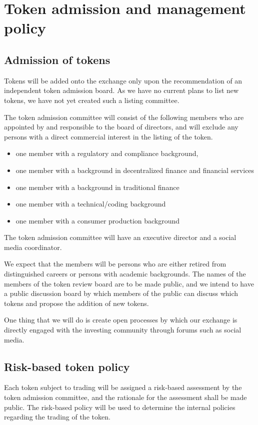 \chapter{Token admission and management policy}

\section{Admission of tokens}

Tokens will be added onto the exchange only upon the recommendation of
an independent token admission board.  As we have no current plans to
list new tokens, we have not yet created such a listing committee.

The token admission committee will consist of the following members
who are appointed by and responsible to the board of directors, and
will exclude any persons with a direct commercial interest in the
listing of the token.

\begin{itemize}
  \item one member with a regulatory and compliance background,
  \item one member with a background in decentralized finance and
    financial services
  \item one member with a background in traditional finance
  \item one member with a technical/coding background
  \item one member with a consumer production background
\end{itemize}

The token admission committee will have an executive director and a
social media coordinator.

We expect that the members will be persons who are either retired from
distinguished careers or persons with academic backgrounds.  The names
of the members of the token review board are to be made public, and we
intend to have a public discussion board by which members of the
public can discuss which tokens and propose the addition of new
tokens.

One thing that we will do is create open processes by which
our exchange is directly engaged with the investing community through
forums such as social media.

\section{Risk-based token policy}
Each token subject to trading will be assigned a risk-based assessment
by the token admission committee, and the rationale for the assessment
shall be made public.  The risk-based policy will be used to determine
the internal policies regarding the trading of the token.

